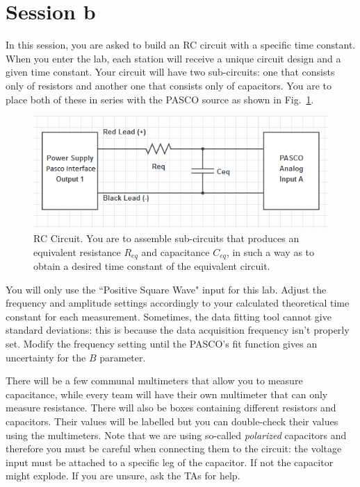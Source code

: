 \documentclass[12pt]{report}
\begin{document}
\section{Session b}
In this session, you are asked to build an RC circuit with a specific time constant. When you enter the lab, each station will receive a unique circuit design and a given time constant. 
Your circuit will have two sub-circuits: one that consists only of resistors and another one that consists only of capacitors. 
You are to place both of these in series with the PASCO source as shown in Fig.~\ref{Fig:lab2-session2-circuit}.

\begin{figure}[h]
\centering
\includegraphics[width=0.9\linewidth]{lab2-session2-circuit}
\caption{RC Circuit. You are to assemble sub-circuits that produces an equivalent resistance $R_{eq}$ and capacitance $C_{eq}$, in such a way as to obtain a desired time constant of the equivalent circuit.}
\label{Fig:lab2-session2-circuit}
\end{figure}

You will only use the ``Positive Square Wave" input for this lab. 
Adjust the frequency and amplitude settings accordingly to your calculated theoretical time constant for each measurement. 
Sometimes, the data fitting tool cannot give standard deviations: this is because the data acquisition frequency isn't properly set. 
Modify the frequency setting until the PASCO's fit function gives an uncertainty for the $B$ parameter. 

There will be a few communal multimeters that allow you to measure capacitance, while every team will have their own multimeter that can only measure resistance. 
There will also be boxes containing different resistors and capacitors. Their values will be labelled but you can double-check their values using the multimeters. 
Note that we are using so-called {\it polarized} capacitors and therefore you must be careful when connecting them to the circuit: the voltage input must be attached to a specific leg of the capacitor. If not the capacitor might explode. If you are unsure, ask the TAs for help. 
\end{document}
